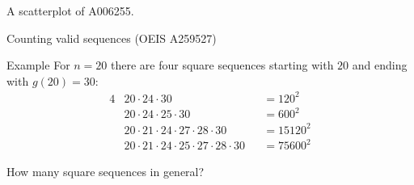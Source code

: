 \documentclass{beamer}
\begin{document}
\begin{frame}{A scatterplot of A006255.}
\end{frame}


\begin{frame}{Counting valid sequences (OEIS A259527)}

  \begin{block}{Example}
    For $n = 20$ there are four square sequences starting with $20$ and ending
    with $g(20)=30$:
    \begin{alignat*}{4}
      &20 \cdot 24 \cdot 30                                     &&= 120^2   \\
      &20 \cdot 24 \cdot 25 \cdot 30                            &&= 600^2   \\
      &20 \cdot 21 \cdot 24 \cdot 27 \cdot 28 \cdot 30          &&= 15120^2 \\
      &20 \cdot 21 \cdot 24 \cdot 25 \cdot 27 \cdot 28 \cdot 30 &&= 75600^2
    \end{alignat*}
  \end{block}
    How many square sequences in general?

\end{frame}
\end{document}
